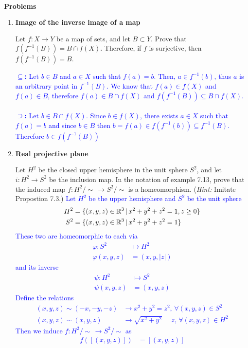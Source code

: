 \documentclass[10pt,a4paper]{report}
\newcommand{\BLUE}[1]{\textcolor{blue}{#1}}
\begin{document}
\HLINE
{}\\
\textbf{Problems}

\begin{enumerate}[label=7.\arabic*.]
	\item \textbf{Image of the inverse image of a map}
	
	Let $f:X\to Y$ be a map of sets, and let $B \subset Y$.  Prove that $f(f^{-1}(B)) = B \cap f(X)$.  Therefore, if $f$ is surjective, then $f(f^{-1}(B)) = B$.
	
	\BLUE{\textbf{$\subseteq$:  }Let $b \in B$ and $a \in X$ such that $f(a) = b$.  Then, $a \in f^{-1}(b)$, thus $a$ is an arbitrary point in $f^{-1}(B)$.  We know that $f(a) \in f(X)$ and $f(a) \in B$, therefore $f(a) \in B \cap f(X)$ and $f(f^{-1}(B)) \subseteq B \cap f(X)$.\\ \\
	\textbf{$\supseteq$:  }Let $b \in B \cap  f(X)$.  Since $b \in f(X)$, there exists $a \in X$ such that $f(a) = b$ and since $b \in B$ then $b = f(a) \in f(f^{-1}(b)) \subseteq f^{-1}(B)$.  Therefore $b \in f(f^{-1}(B))$\\
	}
	
	\item \textbf{Real projective plane}
	
	Let $H^2$ be the closed upper hemisphere in the unit sphere $S^2$, and let $i: H^2 \to S^2$ be the inclusion map.  In the notation of example 7.13, prove that the induced map $f: H^2/\sim \,\to S^2/\sim$ is a homeomorphism. (\textit{Hint:} Imitate Propostion 7.3.)
\newcommand{\HOMEO}{\overset{\sim}\to}	
	\BLUE{Let $H^2$ be the upper hemisphere and $S^2$ be the unit sphere
	\begin{align*}
		H^2 &= \{(x,y,z) \in \mathbb{R}^3\,|\, x^2+y^2+z^2=1, z \ge 0\} \\
		S^2 &= \{(x,y,z) \in \mathbb{R}^3\,|\, x^2+y^2+z^2=1\}
	\end{align*}These two are homeomorphic to each via 
	\begin{align*}
		\varphi : S^2 &\mapsto H^2 \\
		\varphi(x,y,z) &= (x,y, |z|)
	\end{align*} and its inverse
	\begin{align*}
		\psi : H^2 &\mapsto S^2 \\
		\psi(x,y,z) &= (x,y,z)
	\end{align*}Define the relations
	\begin{align*}
		(x,y,z) \sim (-x,-y,-z) &\to x^2+y^2=z^2, \, \forall (x,y,z) \in S^2 \\
		(x,y,z) \sim (x,y, z) &\to \sqrt{x^2+y^2}=z, \, \forall (x,y,z) \in H^2
	\end{align*}Then we induce $f:H^2/\sim\, \to S^2/\sim$ as
	\begin{align*}
		f([(x,y,z)]) &= [(x,y,z)]
	\end{align*}
	}
	

\end{enumerate}
\end{document}

